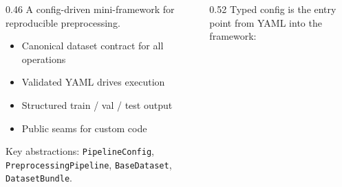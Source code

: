 \begin{frame}

  \vspace{14mm}
  \begin{columns}[T,onlytextwidth]
    \begin{column}{0.46\textwidth}
      {\small A config-driven mini-framework for reproducible preprocessing.}\par
      \vspace{2mm}
      \begin{itemize}
        \item Canonical dataset contract for all operations
        \item Validated YAML drives execution
        \item Structured train / val / test output
        \item Public seams for custom code
      \end{itemize}

      \vspace{1mm}
      {\scriptsize Key abstractions: \texttt{PipelineConfig}, \texttt{PreprocessingPipeline}, \texttt{BaseDataset}, \texttt{DatasetBundle}.}
    \end{column}
    \begin{column}{0.52\textwidth}
      {\scriptsize Typed config is the entry point from YAML into the framework:}\par
      \vspace{1mm}
      
    \end{column}
  \end{columns}

  \slideheaderfooter
\end{frame}
